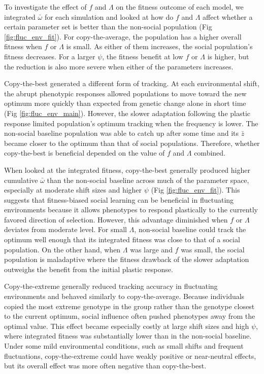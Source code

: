 \documentclass{article}
\begin{document}
To investigate the effect of $f$ and $\Lambda$ on the fitness outcome of each model, we integrated $\bar{\omega}$ for each simulation and looked at how do $f$ and $\Lambda$ affect whether a certain parameter set is better than the non-social population (Fig \ref{fig:fluc_env_fit}). For copy-the-average, the population has a higher overall fitness when $f$ or $\Lambda$ is small. As either of them increases, the social population's fitness decreases. For a larger $\psi$, the fitness benefit at low $f$ or $\Lambda$ is higher, but the reduction is also more severe when either of the parameters increases. 

Copy-the-best generated a different form of tracking. At each environmental shift, the abrupt phenotypic responses allowed populations to move toward the new optimum more quickly than expected from genetic change alone in short time (Fig \ref{fig:fluc_env_main}). However, the slower adaptation following the plastic response limited population's optimum tracking when the frequency is lower. The non-social baseline population was able to catch up after some time and its $\bar{z}$ became closer to the  optimum than that of social populations. Therefore, whether copy-the-best is beneficial depended on the value of $f$ and $\Lambda$ combined.

When looked at the integrated fitness, copy-the-best generally produced higher cumulative $\bar{\omega}$ than the non-social baseline across much of the parameter space, especially at moderate shift sizes and higher $\psi$ (Fig \ref{fig:fluc_env_fit}). This suggests that fitness-biased social learning can be beneficial in fluctuating environments because it allows phenotypes to respond plastically to the currently favored direction of selection. However, this advantage diminished when $f$ or $\Lambda$ deviates from moderate level. For small $\Lambda$, non-social baseline could track the optimum well enough that its integrated fitness was close to that of a social population. On the other hand, when $\Lambda$ was large and $f$ was small, the social population is maladaptive where the fitness drawback of the slower adaptation outweighs the benefit from the initial plastic response.

Copy-the-extreme generally reduced tracking accuracy in fluctuating environments and behaved similarly to copy-the-average. Because individuals copied the most extreme genotype in the group rather than the genotype closest to the current optimum, social influence often pushed phenotypes away from the optimal value. This effect became especially costly at large shift sizes and high $\psi$, where integrated fitness was substantially lower than in the non-social baseline. Under some mild environmental conditions, such as small shifts and frequent fluctuations, copy-the-extreme could have weakly positive or near-neutral effects, but its overall effect was more often negative than copy-the-best.
\end{document}
